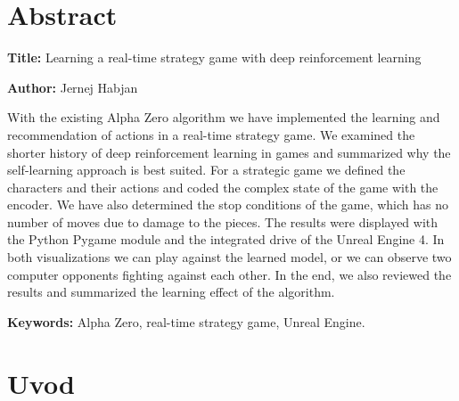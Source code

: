 \documentclass[a4paper, 12pt]{book}
\newcommand{\ttitleEn}{Learning a real-time strategy game with deep reinforcement learning}
\newcommand{\tauthor}{Jernej Habjan}
\newcommand{\tkeywordsEn}{Alpha Zero, real-time strategy game, Unreal Engine}
\newcommand{\clearemptydoublepage}{\newpage{\pagestyle{empty}\cleardoublepage}}
\begin{document}
\chapter*{Abstract}

\noindent\textbf{Title:} \ttitleEn
\bigskip

\noindent\textbf{Author:} \tauthor
\bigskip

\noindent With the existing Alpha Zero algorithm we have implemented the learning and recommendation of actions in a real-time strategy game.
We examined the shorter history of deep reinforcement learning in games and summarized why the self-learning approach is best suited.
For a strategic game we defined the characters and their actions and coded the complex state of the game with the encoder.
We have also determined the stop conditions of the game, which has no number of moves due to damage to the pieces.
The results were displayed with the Python Pygame module and the integrated drive of the Unreal Engine 4.
In both visualizations we can play against the learned model, or we can observe two computer opponents fighting against each other.
In the end, we also reviewed the results and summarized the learning effect of the algorithm.
\bigskip

\noindent\textbf{Keywords:} \tkeywordsEn.
\clearemptydoublepage

\mainmatter
\setcounter{page}{1}
\pagestyle{fancy}


\chapter{Uvod}
\end{document}

